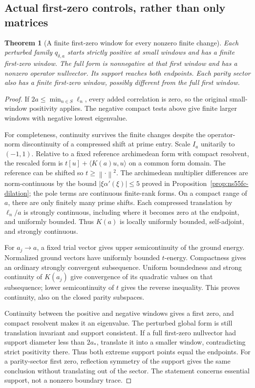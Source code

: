 \documentclass[11pt]{article}
\newtheorem{theorem}{Theorem}[section]
\theoremstyle{remark}
\newcommand{\norm}[1]{\left\lVert #1\right\rVert}
\begin{document}
\subsection*{Actual first-zero controls, rather than only matrices}
\begin{theorem}[A finite first-zero window for every nonzero finite change]\label{thm:ns57-first-zero-controls}
Each perturbed family $q_{\delta,a}$ starts strictly positive at small
windows and has a finite first-zero window. The full form is nonnegative
at that first window and has a nonzero operator nullvector. Its support
reaches both endpoints. Each parity sector also has a finite first-zero
window, possibly different from the full first window.
\end{theorem}
\begin{proof}
If $2a\le\min_{n\in S}\ell_n$, every added correlation is zero, so the
original small-window positivity applies. The negative compact tests
above give finite larger windows with negative lowest eigenvalue.

For completeness, continuity survives the finite changes despite the
operator-norm discontinuity of a compressed shift at prime entry.
Scale $I_a$ unitarily to $(-1,1)$. Relative to a fixed reference
archimedean form with compact resolvent, the rescaled form is
$t[u]+\langle K(a)u,u\rangle$ on a common form domain.
The reference can be shifted so $t\ge\norm{\cdot}^2$.
The archimedean multiplier differences are norm-continuous by the
bound $|\xi\alpha'(\xi)|\le5$ proved in Proposition~\ref{prop:ns55fc-dilation}; the pole terms are continuous
finite-rank forms. On a compact range of $a$, there are only finitely
many prime shifts. Each compressed translation by $\ell_n/a$ is
strongly continuous, including where it becomes zero at the endpoint,
and uniformly bounded. Thus $K(a)$ is locally uniformly bounded,
self-adjoint, and strongly continuous.

For $a_j\to a$, a fixed trial vector gives upper semicontinuity of
the ground energy. Normalized ground vectors have uniformly bounded
$t$-energy. Compactness gives an ordinary strongly convergent
subsequence. Uniform boundedness and strong continuity of $K(a_j)$
give convergence of its quadratic values on that subsequence; lower
semicontinuity of $t$ gives the reverse inequality. This proves
continuity, also on the closed parity subspaces.

Continuity between the positive and negative windows gives a first
zero, and compact resolvent makes it an eigenvalue. The perturbed
global form is still translation invariant and support consistent.
If a full first-zero nullvector had support diameter less than $2a_*$,
translate it into a smaller window, contradicting strict positivity
there. Thus both extreme support points equal the endpoints.
For a parity-sector first zero, reflection symmetry of the support
gives the same conclusion without translating out of the sector.
The statement concerns essential support, not a nonzero boundary trace.
\end{proof}
\end{document}
